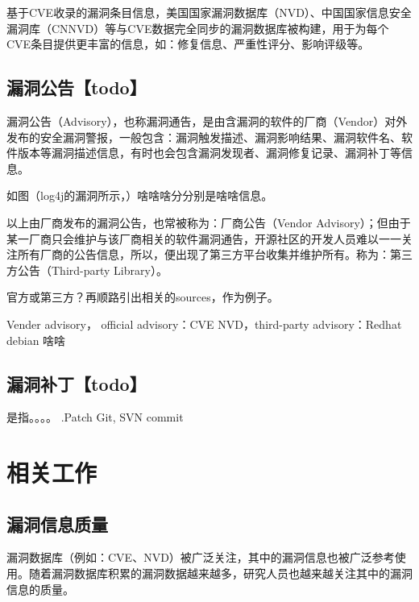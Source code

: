 基于CVE收录的漏洞条目信息，美国国家漏洞数据库（NVD）、中国国家信息安全漏洞库（CNNVD）等与CVE数据完全同步的漏洞数据库被构建，用于为每个CVE条目提供更丰富的信息，如：修复信息、严重性评分、影响评级等。






\subsection{漏洞公告【todo】} 
漏洞公告（Advisory），也称漏洞通告，是由含漏洞的软件的厂商（Vendor）对外发布的安全漏洞警报，一般包含：漏洞触发描述、漏洞影响结果、漏洞软件名、软件版本等漏洞描述信息，有时也会包含漏洞发现者、漏洞修复记录、漏洞补丁等信息。

如图（log4j的漏洞所示，）啥啥啥分分别是啥啥信息。

以上由厂商发布的漏洞公告，也常被称为：厂商公告（Vendor Advisory）；但由于某一厂商只会维护与该厂商相关的软件漏洞通告，开源社区的开发人员难以一一关注所有厂商的公告信息，所以，便出现了第三方平台收集并维护所有。称为：第三方公告（Third-party Library）。

官方或第三方？再顺路引出相关的sources，作为例子。

Vender advisory， official advisory：CVE NVD，third-party advisory：Redhat debian 啥啥

\subsection{漏洞补丁【todo】}
是指。。。。
.Patch
Git, SVN commit 


\section{相关工作}
\subsection{漏洞信息质量}
漏洞数据库（例如：CVE、NVD）被广泛关注，其中的漏洞信息也被广泛参考使用。随着漏洞数据库积累的漏洞数据越来越多，研究人员也越来越关注其中的漏洞信息的质量。


